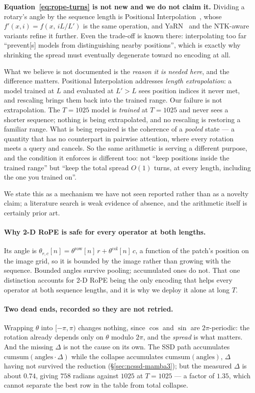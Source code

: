 \documentclass[11pt,a4paper]{article}
\begin{document}
\noindent\textbf{Equation~\eqref{eq:rope-turns} is not new and we do not claim it.} Dividing
a rotary's angle by the sequence length is Positional Interpolation~\cite{posinterp}, whose
$f'(x,i)=f(x,\,iL/L')$ is the same operation, and YaRN~\cite{yarn} and the NTK-aware
variants refine it further. Even the trade-off is known there: interpolating too far
``prevent[s] models from distinguishing nearby positions'', which is exactly why shrinking
the spread must eventually degenerate toward no encoding at all.

What we believe is not documented is the \emph{reason it is needed here}, and the
difference matters. Positional Interpolation addresses \emph{length extrapolation}: a model
trained at $L$ and evaluated at $L'>L$ sees position indices it never met, and rescaling
brings them back into the trained range. Our failure is not extrapolation. The $T{=}1025$
model is \emph{trained} at $T{=}1025$ and never sees a shorter sequence; nothing is being
extrapolated, and no rescaling is restoring a familiar range. What is being repaired is the
coherence of a \emph{pooled} state --- a quantity that has no counterpart in pairwise
attention, where every rotation meets a query and cancels. So the same arithmetic is
serving a different purpose, and the condition it enforces is different too: not ``keep
positions inside the trained range'' but ``keep the total spread $O(1)$ turns, at every
length, including the one you trained on''.

We state this as a mechanism we have not seen reported rather than as a novelty claim; a
literature search is weak evidence of absence, and the arithmetic itself is certainly
prior art.

\paragraph{Why 2-D RoPE is safe for every operator at both lengths.}
Its angle is $\theta_{r,c}[n]=\theta^{\mathrm{row}}[n]\,r+\theta^{\mathrm{col}}[n]\,c$,
a function of the patch's position on the image grid, so it is bounded by the image
rather than growing with the sequence. Bounded angles survive pooling; accumulated
ones do not. That one distinction accounts for 2-D RoPE being the only encoding that
helps every operator at both sequence lengths, and it is why we deploy it alone at
long $T$.

\paragraph{Two dead ends, recorded so they are not retried.}
Wrapping $\theta$ into $[-\pi,\pi)$ changes nothing, since $\cos$ and $\sin$ are
$2\pi$-periodic: the rotation already depends only on $\theta$ modulo $2\pi$, and the
\emph{spread} is what matters. And the missing $\Delta$ is not the cause on its own.
The SSD path accumulates $\mathrm{cumsum}(\text{angles}\cdot\Delta)$ while the
collapse accumulates $\mathrm{cumsum}(\text{angles})$, $\Delta$ having not survived
the reduction (\S\ref{sec:ncssd-mamba3}); but the measured $\Delta$ is about $0.74$,
giving $758$ radians against $1025$ at $T{=}1025$ --- a factor of $1.35$, which cannot
separate the best row in the table from total collapse.
\end{document}
